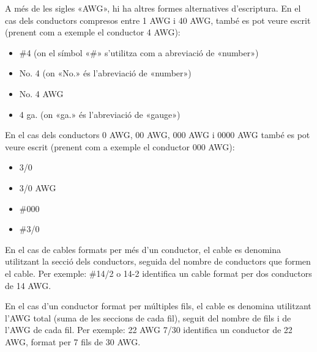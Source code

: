 A més de les sigles «AWG», hi ha altres formes alternatives d'escriptura. En el cas dels conductors compresos entre 1 AWG i 40 AWG, també es pot veure escrit (prenent com a exemple el conductor 4 AWG):
\begin{itemize}
   \item \#4 (on el símbol «\#» s'utilitza com a abreviació de «number»)
   \item No. 4 (on «No.» és l'abreviació de «number»)
   \item No. 4 AWG
   \item 4 ga. (on «ga.» és l'abreviació de «gauge»)
\end{itemize}

En el cas dels conductors 0 AWG, 00 AWG, 000 AWG i 0000 AWG també es pot veure escrit (prenent com a exemple el conductor 000 AWG):
\begin{itemize}
   \item 3/0
   \item 3/0 AWG
   \item \#000
   \item \#3/0
\end{itemize}


En el cas de cables formats per més d'un conductor, el cable es denomina utilitzant la secció dels conductors, seguida del nombre de conductors que formen el cable. Per exemple: \#14/2 o 14-2 identifica un cable format per dos conductors de 14 AWG.

En el cas d'un conductor format per múltiples fils, el cable es denomina utilitzant l'AWG total (suma de les seccions de cada fil), seguit del nombre de fils i de l'AWG de cada fil. Per exemple: 22 AWG 7/30 identifica un conductor de 22 AWG, format per 7 fils de  30 AWG.

